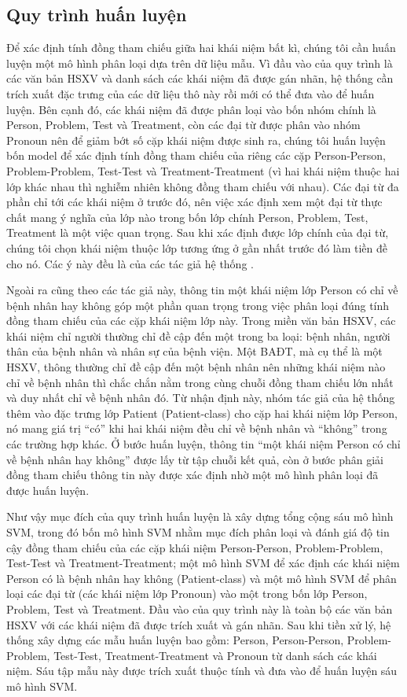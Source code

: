 \subsection*{Quy trình huấn luyện}
Để xác định tính đồng tham chiếu giữa hai khái niệm bất kì, chúng tôi cần huấn luyện một mô hình phân loại dựa trên dữ liệu mẫu. Vì đầu vào của quy trình là các văn bản HSXV và danh sách các khái niệm đã được gán nhãn, hệ thống cần trích xuất đặc trưng của các dữ liệu thô này rồi mới có thể đưa vào để huấn luyện. Bên cạnh đó, các khái niệm đã được phân loại vào bốn nhóm chính là Person, Problem, Test và Treatment, còn các đại từ được phân vào nhóm Pronoun nên để giảm bớt số cặp khái niệm được sinh ra, chúng tôi huấn luyện bốn model để xác định tính đồng tham chiếu của riêng các cặp Person-Person, Problem-Problem, Test-Test và Treatment-Treatment (vì hai khái niệm thuộc hai lớp khác nhau thì nghiễm nhiên không đồng tham chiếu với nhau). Các đại từ đa phần chỉ tới các khái niệm ở trước đó, nên việc xác định xem một đại từ thực chất mang ý nghĩa của lớp nào trong bốn lớp chính Person, Problem, Test, Treatment là một việc quan trọng. Sau khi xác định được lớp chính của đại từ, chúng tôi chọn khái niệm thuộc lớp tương ứng ở gần nhất trước đó làm tiền đề cho nó. Các ý này đều là của các tác giả hệ thống \cite{YanXu2012}.

Ngoài ra cũng theo các tác giả này, thông tin một khái niệm lớp Person có chỉ về bệnh nhân hay không góp một phần quan trọng trong việc phân loại đúng tính đồng tham chiếu của các cặp khái niệm lớp này. Trong miền văn bản HSXV, các khái niệm chỉ người thường chỉ đề cập đến một trong ba loại: bệnh nhân, người thân của bệnh nhân và nhân sự của bệnh viện. Một BAĐT, mà cụ thể là một HSXV, thông thường chỉ đề cập đến một bệnh nhân nên những khái niệm nào chỉ về bệnh nhân thì chắc chắn nằm trong cùng chuỗi đồng tham chiếu lớn nhất và duy nhất chỉ về bệnh nhân đó. Từ nhận định này, nhóm tác giả của hệ thống \cite{YanXu2012} thêm vào đặc trưng lớp Patient (Patient-class) cho cặp hai khái niệm lớp Person, nó mang giá trị ``có'' khi hai khái niệm đều chỉ về bệnh nhân và ``không'' trong các trường hợp khác. Ở bước huấn luyện, thông tin ``một khái niệm Person có chỉ về bệnh nhân hay không'' được lấy từ tập chuỗi kết quả, còn ở bước phân giải đồng tham chiếu thông tin này được xác định nhờ một mô hình phân loại đã được huấn luyện.

Như vậy mục đích của quy trình huấn luyện là xây dựng tổng cộng sáu mô hình SVM, trong đó bốn mô hình SVM nhằm mục đích phân loại và đánh giá độ tin cậy đồng tham chiếu của các cặp khái niệm Person-Person, Problem-Problem, Test-Test và Treatment-Treatment; một mô hình SVM để xác định các khái niệm Person có là bệnh nhân hay không (Patient-class) và một mô hình SVM để phân loại các đại từ (các khái niệm lớp Pronoun) vào một trong bốn lớp Person, Problem, Test và Treatment. Đầu vào của quy trình này là toàn bộ các văn bản HSXV với các khái niệm đã được trích xuất và gán nhãn. Sau khi tiền xử lý, hệ thống xây dựng các mẫu huấn luyện bao gồm: Person, Person-Person, Problem-Problem, Test-Test, Treatment-Treatment và Pronoun từ danh sách các khái niệm. Sáu tập mẫu này được trích xuất thuộc tính và đưa vào để huấn luyện sáu mô hình SVM. 

